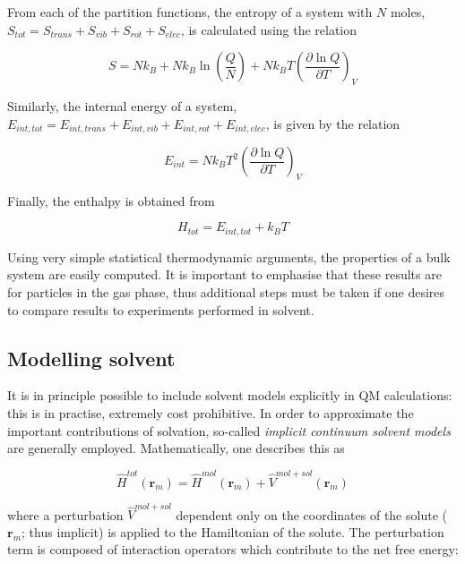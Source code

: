 \noindent From each of the partition functions, the entropy of a system with $N$ moles, $S_{tot} = S_{trans} + S_{vib } +S_{rot} + S_{elec}$, is calculated using the relation

\begin{equation}
  S = Nk_B + Nk_B\ln\left( \frac{Q}{N} \right) + Nk_BT \left( \frac{\partial
      \ln Q}{\partial T} \right)_V
\end{equation}

\noindent Similarly, the internal energy of a system, $E_{int,tot} = E_{int,trans} + E_{int,vib} + E_{int,rot} + E_{int,elec}$, is given by the relation

\begin{equation}
  E_{int} = Nk_BT^2\left( \frac{\partial \ln Q}{\partial T} \right)_V
\end{equation}

\noindent Finally, the enthalpy is obtained from

\begin{equation}
  H_{tot} = E_{int,tot} + k_BT
\end{equation}

Using very simple statistical thermodynamic arguments, the properties of a bulk system are easily computed. It is important to emphasise that these results are for particles in the gas phase, thus additional steps must be taken if one desires to compare results to experiments performed in solvent.

\subsection{Modelling solvent}

It is in principle possible to include solvent models explicitly in QM calculations: this is in practise, extremely cost prohibitive. In order to approximate the important contributions of solvation, so-called \emph{implicit continuum solvent models} are generally employed.\cite{Mennucci2007,Cramer2004} Mathematically, one describes this as

\begin{equation}
  \hat{H}^{tot}(\mathbf{r}_m) = \hat{H}^{mol}(\mathbf{r}_m) + \hat{V}^{mol+sol}(\mathbf{r}_m)
\end{equation}

\noindent where a perturbation $\hat{V}^{mol+sol}$ dependent only on the coordinates of the solute ($\mathbf{r}_m$; thus implicit) is applied to the Hamiltonian of the solute. The perturbation term is composed of interaction operators which contribute to the net free energy:

